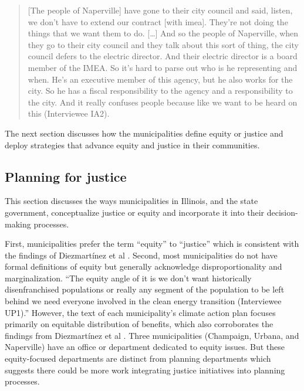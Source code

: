 \begin{quote}
    [The people of Naperville] have gone to their city council and said, listen,
    we don't have to extend our contract [with \ac{imea}]. They're not doing the
    things that we want them to do. [\dots] And so the people of Naperville,
    when they go to their city council and they talk about this sort of thing,
    the city council defers to the electric director. And their electric
    director is a board member of the IMEA. So it's hard to parse out who is he
    representing and when. He's an executive member of this agency, but he also
    works for the city. So he has a fiscal responsibility to the agency and a
    responsibility to the city. And it really confuses people because like we
    want to be heard on this (Interviewee IA2).
\end{quote}

The next section discusses how the municipalities define equity or justice and
deploy strategies that advance equity and justice in their communities.

\subsection{Planning for justice}
\label{section:muni-justice}

This section discusses the ways municipalities in Illinois, and the state
government, conceptualize justice or equity and incorporate it into their
decision-making processes.

First, municipalities prefer the term ``equity'' to ``justice'' which is
consistent with the findings of Diezmart\'inez et al
\cite{diezmartinez_us_2022}. Second, most municipalities do not have formal
definitions of equity but generally acknowledge disproportionality and
marginalization. ``The equity angle of it is we don't want historically
disenfranchised populations or really any segment of the population to be left
behind we need everyone involved in the clean energy transition (Interviewee
UP1).'' However, the text of each municipality's climate action plan focuses
primarily on equitable distribution of benefits, which also corroborates the
findings from Diezmart\'inez et al \cite{diezmartinez_us_2022}. Three
municipalities (Champaign, Urbana, and Naperville) have an office or department
dedicated to equity issues. But these equity-focused departments are distinct
from planning departments which suggests there could be more work integrating
justice initiatives into planning processes.

